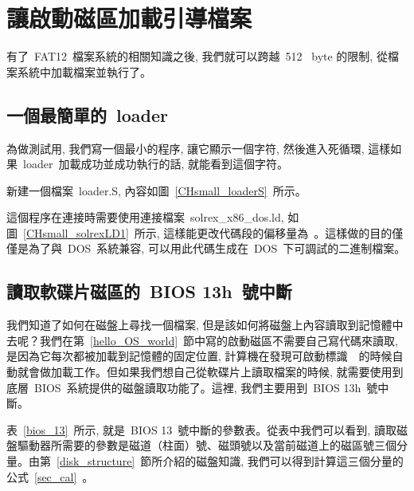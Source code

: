 \section{讓啟動磁區加載引導檔案}

有了~FAT12~檔案系統的相關知識之後, 我們就可以跨越~512~ byte 的限制, 從檔案系統中加載檔案並執行了。

\subsection{一個最簡單的~loader}

為做測試用, 我們寫一個最小的程序, 讓它顯示一個字符, 然後進入死循環, 這樣如果~loader~加載成功並成功執行的話, 就能看到這個字符。

新建一個檔案~loader.S, 內容如圖~\ref{CHsmall_loaderS}~所示。

\label{CHsmall_loaderS}

這個程序在連接時需要使用連接檔案~solrex\_x86\_dos.ld, 如圖~\ref{CHsmall_solrexLD1}~所示, 這樣能更改代碼段的偏移量為~。這樣做的目的僅僅是為了與~DOS~系統兼容, 可以用此代碼生成在~DOS~下可調試的二進制檔案。

\label{CHsmall_solrexLD1}

\subsection{讀取軟碟片磁區的~BIOS 13h~號中斷}

我們知道了如何在磁盤上尋找一個檔案, 但是該如何將磁盤上內容讀取到記憶體中去呢？我們在第~\ref{hello_OS_world}~節中寫的啟動磁區不需要自己寫代碼來讀取, 是因為它每次都被加載到記憶體的固定位置, 計算機在發現可啟動標識~~的時候自動就會做加載工作。但如果我們想自己從軟碟片上讀取檔案的時候, 就需要使用到底層~BIOS~系統提供的磁盤讀取功能了。這裡, 我們主要用到~BIOS 13h~號中斷。

表~\ref{bios_13}~所示, 就是~BIOS 13~號中斷的參數表。從表中我們可以看到, 讀取磁盤驅動器所需要的參數是磁道（柱面）號、磁頭號以及當前磁道上的磁區號三個分量。由第~\ref{disk_structure}~節所介紹的磁盤知識, 我們可以得到計算這三個分量的公式~\ref{sec_cal}~。

